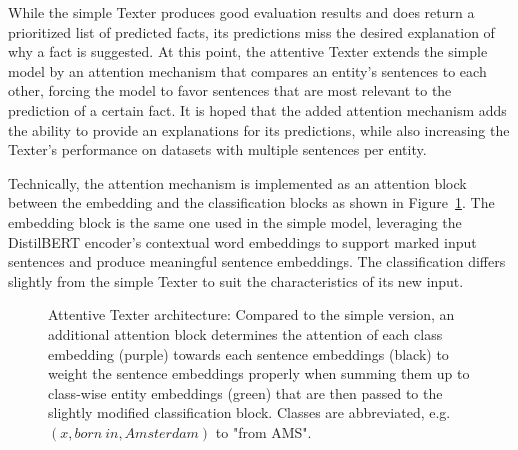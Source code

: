 While the simple Texter produces good evaluation results and does return a prioritized list of predicted facts, its predictions miss the desired explanation of why a fact is suggested. At this point, the attentive Texter extends the simple model by an attention mechanism that compares an entity's sentences to each other, forcing the model to favor sentences that are most relevant to the prediction of a certain fact. It is hoped that the added attention mechanism adds the ability to provide an explanations for its predictions, while also increasing the Texter's performance on datasets with multiple sentences per entity.

Technically, the attention mechanism is implemented as an attention block between the embedding and the classification blocks as shown in Figure~\ref{fig:4_approach/1_texter/3_attention_model/attention_architecture}. The embedding block is the same one used in the simple model, leveraging the DistilBERT encoder's contextual word embeddings to support marked input sentences and produce meaningful sentence embeddings. The classification differs slightly from the simple Texter to suit the characteristics of its new input.

\begin{figure}[t]
    \caption{Attentive Texter architecture: Compared to the simple version, an additional attention block determines the attention of each class embedding (purple) towards each sentence embeddings (black) to weight the sentence embeddings properly when summing them up to class-wise entity embeddings (green) that are then passed to the slightly modified classification block. Classes are abbreviated, e.g. $(x, born~in, Amsterdam)$ to "from AMS".}
    \label{fig:4_approach/1_texter/3_attention_model/attention_architecture}
\end{figure}

